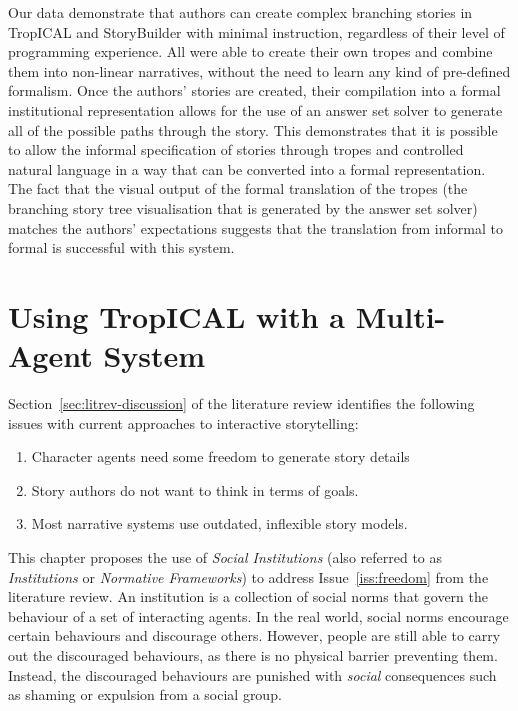 \documentclass[11pt]{report}
\begin{document}
Our data demonstrate that authors can create complex branching stories in
TropICAL and StoryBuilder with minimal instruction, regardless of their level of
programming experience. All were able to create their own tropes and combine
them into non-linear narratives, without the need to learn any kind of
pre-defined formalism. Once the authors' stories are created, their compilation
into a formal institutional representation allows for the use of an answer set
solver to generate all of the possible paths through the story. This
demonstrates that it is possible to allow the informal specification of stories
through tropes and controlled natural language in a way that can be converted
into a formal representation. The fact that the visual output of the formal translation
of the tropes (the branching story tree visualisation that is generated by the
answer set solver) matches the authors' expectations suggests that the
translation from informal to formal is successful with this system.

\chapter{Using TropICAL with a Multi-Agent System}
\label{cha:institutions}


Section~\ref{sec:litrev-discussion} of the literature review identifies the following issues with current approaches to interactive storytelling:

\begin{enumerate}[{Issue} 1:]
\item Character agents need some freedom to generate story details
\item Story authors do not want to think in terms of goals.
\item Most narrative systems use outdated, inflexible story models.
\end{enumerate}

This chapter proposes the use of \emph{Social Institutions} (also referred to as
\emph{Institutions} or \emph{Normative Frameworks}) to address
Issue~\ref{iss:freedom} from the literature review. An institution is a
collection of social norms that govern the behaviour of a set of interacting
agents. In the real world, social norms encourage certain behaviours and
discourage others. However, people are still able to carry out the discouraged
behaviours, as there is no physical barrier preventing them. Instead, the
discouraged behaviours are punished with \emph{social} consequences such as
shaming or expulsion from a social group.
\end{document}
